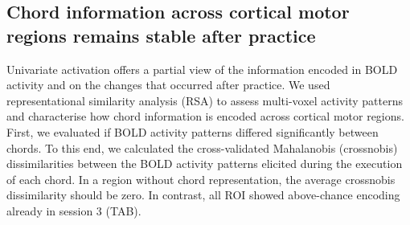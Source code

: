 \documentclass{article}
\begin{document}
\begin{table}[H]
    \centering
    \caption{ROI-based statistics of the univariate activation in the left hemisphere. Uncorrected $p$-values are provided.}
    
    \label{tab:activation_stats}
\end{table}

\subsection{Chord information across cortical motor regions remains stable after practice}

Univariate activation offers a partial view of the information encoded in BOLD activity and on the changes that occurred after practice. We used representational similarity analysis (RSA) to assess multi-voxel activity patterns and characterise how chord information is encoded across cortical motor regions. First, we evaluated if BOLD activity patterns differed significantly between chords. To this end, we calculated the cross-validated Mahalanobis (crossnobis) dissimilarities between the BOLD activity patterns elicited during the execution of each chord. In a region without chord representation, the average crossnobis dissimilarity should be zero. In contrast, all ROI showed above-chance encoding already in session 3 (TAB). \\
\end{document}
